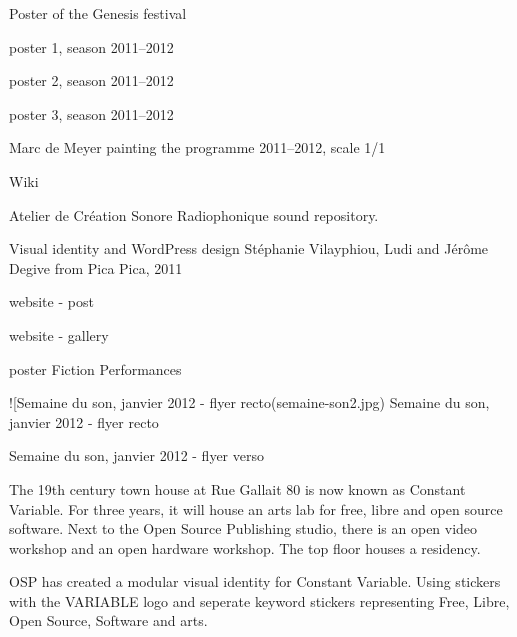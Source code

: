 {} Poster of the Genesis
festival

{} poster 1, season
2011--2012

{} poster 2, season
2011--2012

{} poster 3, season
2011--2012

{} Marc de Meyer painting the
programme 2011--2012, scale 1/1

{} Wiki










\subject{acsr}

Atelier de Création Sonore Radiophonique sound repository.

\from[1] Visual
identity and WordPress design Stéphanie Vilayphiou, Ludi and Jérôme
Degive from Pica Pica, 2011

{} website - post

{} website - gallery

{} poster Fiction Performances

!{[}Semaine du son, janvier 2012 - flyer
recto(semaine-son2.jpg) Semaine du son, janvier 2012
- flyer recto

{} Semaine du son, janvier 2012 -
flyer verso




\subject{Constant Variable}


The 19th century town house at Rue Gallait 80 is now known as Constant
Variable. For three years, it will house an arts lab for free, libre and
open source software. Next to the Open Source Publishing studio, there
is an open video workshop and an open hardware workshop. The top floor
houses a residency.

OSP has created a modular visual identity for Constant Variable. Using
stickers with the VARIABLE logo and seperate keyword stickers
representing Free, Libre, Open Source, Software and arts.

